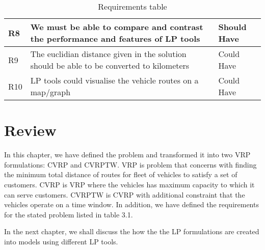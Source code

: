 \begin{table}[!ht]
\begin{tabular}{|l|p{8cm}|l|}
R8  & We must be able to compare and contrast the performance and features of LP tools                                                                                & Should Have \\ \hline
R9  & The euclidian distance given in the solution should be able to be converted to kilometers                                                                       & Could Have  \\ \hline
R10 & LP tools could visualise the vehicle routes on a map/graph                                                                                                      & Could Have  \\ \hline
\end{tabular}
\caption{Requirements table}
\label{requirements-table}
\end{table}

\section{Review}
In this chapter, we have defined the problem and transformed it into two VRP formulations: CVRP and CVRPTW. VRP is problem
that concerns with finding the minimum total distance of routes for fleet of vehicles to satisfy a set of customers. CVRP is VRP
where the vehicles has maximum capacity to which it can serve customers. CVRPTW is CVRP with additional constraint that
the vehicles operate on a time window. In addition, we have defined the requirements for the stated problem listed in table 3.1.

In the next chapter, we shall discuss the how the the LP formulations are created into models using different LP tools.